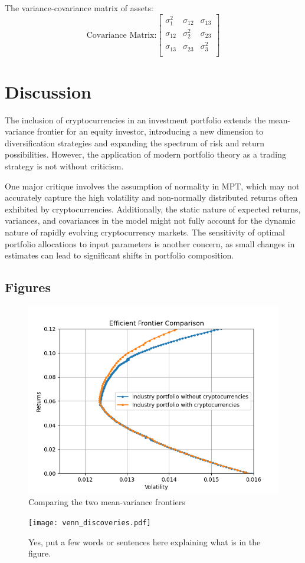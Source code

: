 \documentclass[12pt,a4paper]{article}
\begin{document}
\noindent The variance-covariance matrix of assets: 
\[
\text{Covariance Matrix:}
\begin{bmatrix}
    \sigma_{1}^2 & \sigma_{12} & \sigma_{13} \\
    \sigma_{12} & \sigma_{2}^2 & \sigma_{23} \\
    \sigma_{13} & \sigma_{23} & \sigma_{3}^2 \\
\end{bmatrix}
\]


\section{Discussion}\label{sec:discussion}
The inclusion of cryptocurrencies in an investment portfolio extends the mean-variance frontier for an equity investor, 
introducing a new dimension to diversification strategies and expanding the spectrum of risk and return possibilities. 
However, the application of modern portfolio theory as a trading strategy is not without criticism. 

\noindent One major critique involves the assumption of normality in MPT, which may not accurately capture the high 
volatility and non-normally distributed returns often exhibited by cryptocurrencies. Additionally, the static nature
 of expected returns, variances, and covariances in the model might not fully account for the dynamic nature of rapidly 
 evolving cryptocurrency markets. The sensitivity of optimal portfolio allocations to input parameters is another concern, 
 as small changes in estimates can lead to significant shifts in portfolio composition.

\subsection{Figures}\label{sec:future}

\begin{figure}
    \centering
    \includegraphics[width=1\linewidth]{figures/figure1.png}
    \caption{Comparing the two mean-variance frontiers}
    \label{fig:enter-label}
\end{figure}


\begin{figure}[htbp!]
\begin{center}
\texttt{[image: venn\_discoveries.pdf]}
\end{center}
\caption{Yes, put a few words or sentences here explaining what is in the figure.}
\label{fig:venn}
\end{figure}



\end{document}
